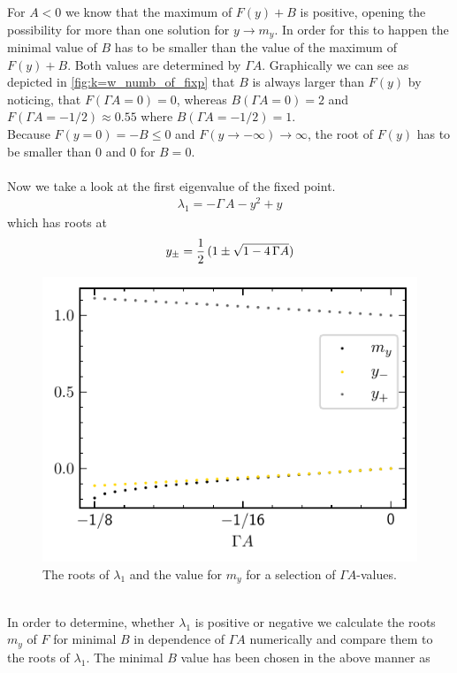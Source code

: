 \documentclass{article}
\begin{document}
For $A<0$ we know that the maximum of $F(y)+B$ is positive, opening the possibility for more than one solution for $y\rightarrow m_y$. In order for this to happen the minimal value of $B$ has to be smaller than the value of the maximum of $F(y)+B$. Both values are determined by $\Gamma A$. Graphically we can see as depicted in \autoref{fig:k=w_numb_of_fixp} that $B$ is always larger than $F(y)$ by noticing, that $F(\Gamma A = 0)=0$, whereas $B(\Gamma A=0)=2$ and $F(\Gamma A = -1/2)\approx0.55$ where $B(\Gamma A= -1/2)=1$.\\
Because $F(y=0)=-B\leq0$ and $F(y\rightarrow-\infty)\rightarrow\infty$, the root of $F(y)$ has to be smaller than $0$ and $0$ for $B=0$.\\\\

Now we take a look at the first eigenvalue of the fixed point.
\begin{align*}
     \lambda_1=-\Gamma\,A-y^2+y
\end{align*}
which has roots at
\begin{align*}
    y_{\pm}=\frac{1}{2}\,(1\pm\sqrt{1-4\,\Gamma A})
\end{align*}
\begin{figure}
    \includegraphics{pictures/k=w_sign_of_ev1.pdf}
    \vspace*{-2cm}\caption{The roots of $\lambda_1$ and the value for $m_y$ for a selection of $\Gamma A$-values.}
    \label{fig:k=w_sign_lam1}
\end{figure}\\
In order to determine, whether $\lambda_1$ is positive or negative we calculate the roots $m_y$ of $F$ for minimal $B$ in dependence of $\Gamma A$ numerically and compare them to the roots of $\lambda_1$. The minimal $B$ value has been chosen in the above manner as
\end{document}
